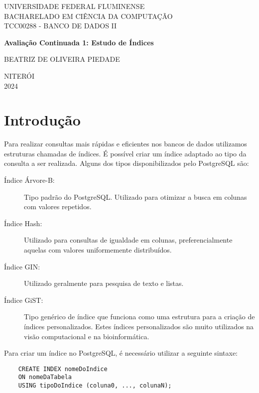 \documentclass[12pt,a4paper]{article}
\begin{document}
	
\begin{titlepage}
	\centering
	\vspace{2cm}
	
	{UNIVERSIDADE FEDERAL FLUMINENSE} \\ [0.1cm]
	{BACHARELADO EM CIÊNCIA DA COMPUTAÇÃO} \\ [0.1cm]
	{TCC00288 - BANCO DE DADOS II}
	
	\vfill
	
	{\Large \bfseries Avaliação Continuada 1: Estudo de Índices}
	
	\vfill
	
	{BEATRIZ DE OLIVEIRA PIEDADE}
	
	\vfill
	{NITERÓI} \\
	{2024}
\end{titlepage}

\tableofcontents

\newpage
\section{Introdução}

Para realizar consultas mais rápidas e eficientes nos bancos de dados utilizamos estruturas chamadas de índices. É possível criar um índice adaptado ao tipo da consulta a ser realizada. Alguns dos tipos disponibilizados pelo PostgreSQL são:

\begin{description}
	\item[Índice Árvore-B:] Tipo padrão do PostgreSQL. Utilizado para otimizar a busca em colunas com valores repetidos.
	\item[Índice Hash:] Utilizado para consultas de igualdade em colunas, preferencialmente aquelas com valores uniformemente distribuídos.
	\item[Índice GIN:] Utilizado geralmente para pesquisa de texto e listas.
	\item[Índice GiST:] Tipo genérico de índice que funciona como uma estrutura para a criação de índices personalizados. Estes índices personalizados são muito utilizados na visão computacional e na bioinformática.
\end{description}

\noindent
Para criar um índice no PostgreSQL, é necessário utilizar a seguinte sintaxe:

\begin{verbatim}
	CREATE INDEX nomeDoIndice
	ON nomeDaTabela
	USING tipoDoIndice (coluna0, ..., colunaN);
\end{verbatim}
\end{document}
